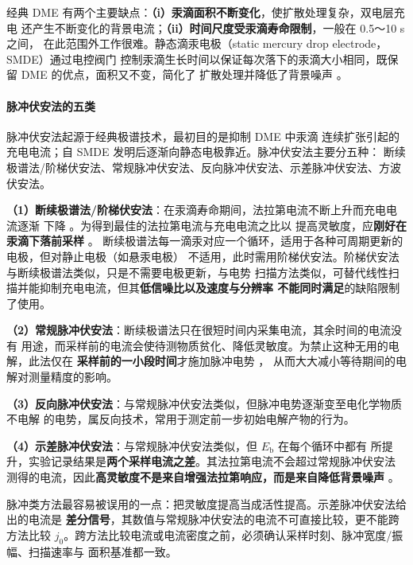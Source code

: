 经典 DME 有两个主要缺点：\textbf{（i）汞滴面积不断变化}，使扩散处理复杂，双电层充电
还产生不断变化的背景电流；\textbf{（ii）时间尺度受汞滴寿命限制}，一般在 0.5～10 s 之间，
在此范围外工作很难。静态滴汞电极（static mercury drop electrode，SMDE）通过电控阀门
控制汞滴生长时间以保证每次落下的汞滴大小相同，既保留 DME 的优点，面积又不变，简化了
扩散处理并降低了背景噪声 。

\paragraph{脉冲伏安法的五类} 脉冲伏安法起源于经典极谱技术，最初目的是抑制 DME 中汞滴
连续扩张引起的充电电流；自 SMDE 发明后逐渐向静态电极靠近。脉冲伏安法主要分五种：
断续极谱法/阶梯伏安法、常规脉冲伏安法、反向脉冲伏安法、示差脉冲伏安法、方波伏安法。

\textbf{（1）断续极谱法/阶梯伏安法}：在汞滴寿命期间，法拉第电流不断上升而充电电流逐渐
下降 。为得到最佳的法拉第电流与充电电流之比以
提高灵敏度，应\textbf{刚好在汞滴下落前采样} 。
断续极谱法每一滴汞对应一个循环，适用于各种可周期更新的电极，但对静止电极（如悬汞电极）
不适用，此时需用阶梯伏安法。阶梯伏安法与断续极谱法类似，只是不需要电极更新，与电势
扫描方法类似，可替代线性扫描并能抑制充电电流，但其\textbf{低信噪比以及速度与分辨率
不能同时满足}的缺陷限制了使用。

\textbf{（2）常规脉冲伏安法}：断续极谱法只在很短时间内采集电流，其余时间的电流没有
用途，而采样前的电流会使待测物质贫化、降低灵敏度。为禁止这种无用的电解，此法仅在
\textbf{采样前的一小段时间}才施加脉冲电势 ，
从而大大减小等待期间的电解对测量精度的影响。

\textbf{（3）反向脉冲伏安法}：与常规脉冲伏安法类似，但脉冲电势逐渐变至电化学物质不电解
的电势，属反向技术，常用于测定前一步初始电解产物的行为。

\textbf{（4）示差脉冲伏安法}：与常规脉冲伏安法类似，但 $E_{\mathrm{b}}$ 在每个循环中都有
所提升，实验记录结果是\textbf{两个采样电流之差}。其法拉第电流不会超过常规脉冲伏安法
测得的电流，因此\textbf{高灵敏度不是来自增强法拉第响应，而是来自降低背景噪声}
。

\begin{pitfall}
脉冲类方法最容易被误用的一点：把灵敏度提高当成活性提高。示差脉冲伏安法给出的电流是
\textbf{差分信号}，其数值与常规脉冲伏安法的电流不可直接比较，更不能跨方法比较
$j_0$。跨方法比较电流或电流密度之前，必须确认采样时刻、脉冲宽度/振幅、扫描速率与
面积基准都一致。
\end{pitfall}

